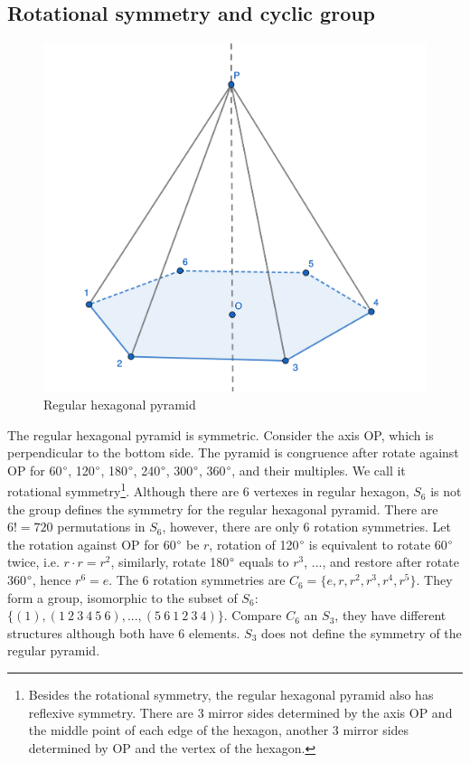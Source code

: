 \documentclass[b5paper]{article}
\begin{document}
\subsection{Rotational symmetry and cyclic group}

\begin{figure}[htbp]
 \centering
 \includegraphics[scale=0.8]{img/hexagonal-pyramid}
 \caption{Regular hexagonal pyramid}
 \label{fig:regular-hexagonal-pyramid}
\end{figure}

The regular hexagonal pyramid is symmetric. Consider the axis OP, which is perpendicular to the bottom side. The pyramid is congruence after rotate against OP for 60$\degree$, 120$\degree$, 180$\degree$, 240$\degree$, 300$\degree$, 360$\degree$, and their multiples. We call it rotational symmetry\footnote{Besides the rotational symmetry, the regular hexagonal pyramid also has reflexive symmetry. There are 3 mirror sides determined by the axis OP and the middle point of each edge of the hexagon, another 3 mirror sides determined by OP and the vertex of the hexagon.}. Although there are 6 vertexes in regular hexagon, $S_6$ is not the group defines the symmetry for the regular hexagonal pyramid. There are $6! = 720$ permutations in $S_6$, however, there are only 6 rotation symmetries. Let the rotation against OP for 60$\degree$ be $r$, rotation of 120$\degree$ is equivalent to rotate 60$\degree$ twice, i.e. $r \cdot r = r^2$, similarly, rotate 180$\degree$ equals to $r^3$, ..., and restore after rotate 360$\degree$, hence $r^6 = e$. The 6 rotation symmetries are $C_6 = \{e, r, r^2, r^3, r^4, r^5\}$. They form a group, isomorphic to the subset of $S_6$: $\{(1), (1\ 2\ 3\ 4\ 5\ 6), ..., (5\ 6\ 1\ 2\ 3\ 4)\}$. Compare $C_6$ an $S_3$, they have different structures although both have 6 elements. $S_3$ does not define the symmetry of the regular pyramid.
\end{document}
